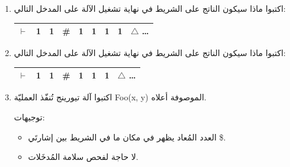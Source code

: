 \documentclass[14pt]{extarticle}
\begin{document}
\begin{enumerate}[label=\arabic*., start=4]
\begin{enumerate}

\item[أ.] اكتبوا ماذا سيكون الناتج على الشريط في نهاية تشغيل الآلة على المدخل التالي:

\begin{center}
\begin{english}
\begin{tabular}{|c|c|c|c|c|c|c|c|c|}
\hline
$\vdash$ & 1 & 1 & \# & 1 & 1 & 1 & 1 & $\triangle$ \ldots \\
\hline
\end{tabular}
\end{english}
\end{center}

\item[ب.] اكتبوا ماذا سيكون الناتج على الشريط في نهاية تشغيل الآلة على المدخل التالي:

\begin{center}
\begin{english}
\begin{tabular}{|c|c|c|c|c|c|c|c|}
\hline
$\vdash$ & 1 & 1 & \# & 1 & 1 & 1 & $\triangle$ \ldots \\
\hline
\end{tabular}
\end{english}
\end{center}

\item[ج.] اكتبوا آلة تيورينج تُنفّذ العمليّة \textenglish{Foo(x, y)} الموصوفة أعلاه.

توجيهات:
\begin{itemize}
    \item العدد المُعاد يظهر في مكان ما في الشريط بين إشارتَي \$.
    \item لا حاجة لفحص سلامة المُدخَلات.
\end{itemize}

\end{enumerate}
\end{enumerate}
\end{document}
